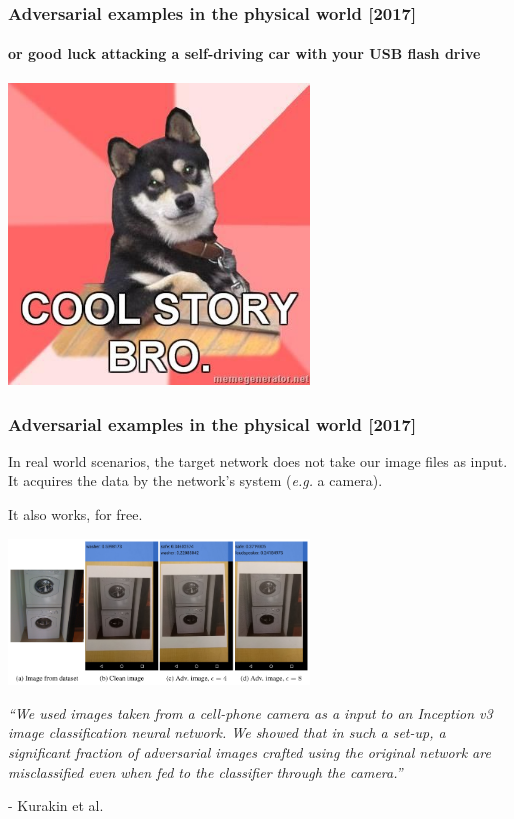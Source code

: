 \documentclass[9pt]{beamer}
\begin{document}
\begin{frame}
  \frametitle{Adversarial examples in the physical world [2017]}

  \framesubtitle{or good luck attacking a self-driving car with
    your USB flash drive}

  \begin{center}
    \includegraphics[width = 8cm]{images/cool_story_bro_2.jpg}
  \end{center}

\end{frame}

\begin{frame}
  \frametitle{Adversarial examples in the physical world [2017]}

  In real world scenarios, the target network does not take our image
  files as input. It acquires the data by the network's system
  (\textit{e.g.} a camera).

  \medskip

  It also works, for free.

  \begin{center}
    \includegraphics[width = 8cm]{images/physical_adversarial_sample.png}
  \end{center}


  \textit{``We used images taken from a cell-phone camera as a input
    to an Inception v3 image classification neural network. We showed
    that in such a set-up, a significant fraction of adversarial
    images crafted using the original network are misclassified even
    when fed to the classifier through the camera.''}

  \smallskip

  - Kurakin et al.

\end{frame}
\end{document}

